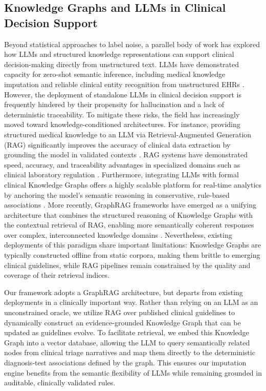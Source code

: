 \documentclass[pmlr]{jmlr}%
\begin{document}
\subsection*{Knowledge Graphs and LLMs in Clinical Decision Support}
Beyond statistical approaches to label noise, a parallel body of work has explored how LLMs and structured knowledge representations can support clinical decision-making directly from unstructured text. LLMs have demonstrated capacity for zero-shot semantic inference, including medical knowledge imputation \cite{yao2025can} and reliable clinical entity recognition from unstructured EHRs \cite{islam2025llm}. However, the deployment of standalone LLMs in clinical decision support is frequently hindered by their propensity for hallucination and a lack of deterministic traceability. To mitigate these risks, the field has increasingly moved toward knowledge-conditioned architectures. For instance, providing structured medical knowledge to an LLM via Retrieval-Augmented Generation (RAG) significantly improves the accuracy of clinical data extraction by grounding the model in validated contexts \cite{li2025automated}. RAG systems have demonstrated speed, accuracy, and traceability advantages in specialized domains such as clinical laboratory regulation \cite{nanua2025retrieval}. Furthermore, integrating LLMs with formal clinical Knowledge Graphs offers a highly scalable platform for real-time analytics by anchoring the model's semantic reasoning in conservative, rule-based associations \cite{cao2026real}. More recently, GraphRAG frameworks have emerged as a unifying architecture that combines the structured reasoning of Knowledge Graphs with the contextual retrieval of RAG, enabling more semantically coherent responses over complex, interconnected knowledge domains \cite{edge2024graphrag, peng2024graphrag}. Nevertheless, existing deployments of this paradigm share important limitations: Knowledge Graphs are typically constructed offline from static corpora, making them brittle to emerging clinical guidelines, while RAG pipelines remain constrained by the quality and coverage of their retrieval indices.

Our framework adopts a GraphRAG architecture, but departs from existing deployments in a clinically important way. Rather than relying on an LLM as an unconstrained oracle, we utilize RAG over published clinical guidelines to dynamically construct an evidence-grounded Knowledge Graph that can be updated as guidelines evolve. To facilitate retrieval, we embed this Knowledge Graph into a vector database, allowing the LLM to query semantically related nodes from clinical triage narratives and map them directly to the deterministic diagnosis-test associations defined by the graph. This ensures our imputation engine benefits from the semantic flexibility of LLMs while remaining grounded in auditable, clinically validated rules.
\end{document}
